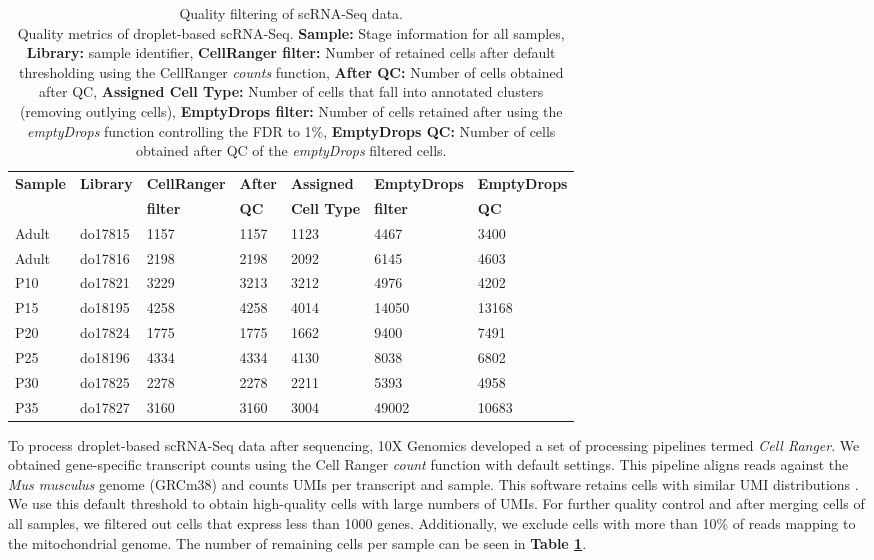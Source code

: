\begin{table}[ht]
\centering
\caption[Quality filtering of scRNA-Seq data.]{Quality filtering of scRNA-Seq data. \\
Quality metrics of droplet-based scRNA-Seq. \textbf{Sample:} Stage information for all samples, \textbf{Library:} sample identifier, \textbf{CellRanger filter:} Number of retained cells after default thresholding using the CellRanger \emph{counts} function,  \textbf{After QC:} Number of cells obtained after \gls{QC}, \textbf{Assigned Cell Type:} Number of cells that fall into annotated clusters (removing outlying cells), \textbf{EmptyDrops filter:} Number of cells retained after using the \emph{emptyDrops} function controlling the FDR to 1\%, \textbf{EmptyDrops QC:} Number of cells obtained after QC of the \emph{emptyDrops} filtered cells.
}
\label{tab3:QC_scRNAseq}
\begin{tabular}{lllllll}
\toprule
\textbf{Sample} & \textbf{Library} & \textbf{CellRanger} & \textbf{After} & \textbf{Assigned} & \textbf{EmptyDrops} & \textbf{EmptyDrops} \\
& & \textbf{filter} & \textbf{QC} & \textbf{Cell Type} & \textbf{filter} & \textbf{QC} \\
\midrule
Adult & do17815 & 1157 & 1157 & 1123 & 4467 & 3400 \\
\midrule
Adult & do17816 & 2198 & 2198 & 2092 & 6145 & 4603 \\
\midrule
P10 & do17821 & 3229 & 3213 & 3212 & 4976 & 4202 \\
\midrule
P15 & do18195 & 4258 & 4258 & 4014 & 14050 & 13168 \\
\midrule
P20 & do17824 & 1775 & 1775 & 1662 & 9400 & 7491 \\
\midrule
P25 & do18196 & 4334 & 4334 & 4130 & 8038 & 6802 \\
\midrule
P30 & do17825 & 2278 & 2278 & 2211 & 5393 & 4958 \\
\midrule
P35 & do17827 & 3160 & 3160 & 3004 & 49002 & 10683 \\                 
\bottomrule   
\end{tabular}
\end{table}

To process droplet-based scRNA-Seq data after sequencing, 10X Genomics\texttrademark{} developed a set of processing pipelines termed \textit{Cell Ranger}. We obtained gene-specific transcript counts using the Cell Ranger \emph{count} function with default settings. This pipeline aligns reads against the \emph{Mus musculus} genome (GRCm38) and counts UMIs per transcript and sample. This software retains cells with similar UMI distributions \citep{Zheng2017}. We use this default threshold to obtain high-quality cells with large numbers of UMIs. For further quality control and after merging cells of all samples, we filtered out cells that express less than 1000 genes. Additionally, we exclude cells with more than 10\% of reads mapping to the mitochondrial genome. The number of remaining cells per sample can be seen in \textbf{Table \ref{tab3:QC_scRNAseq}}.\\

